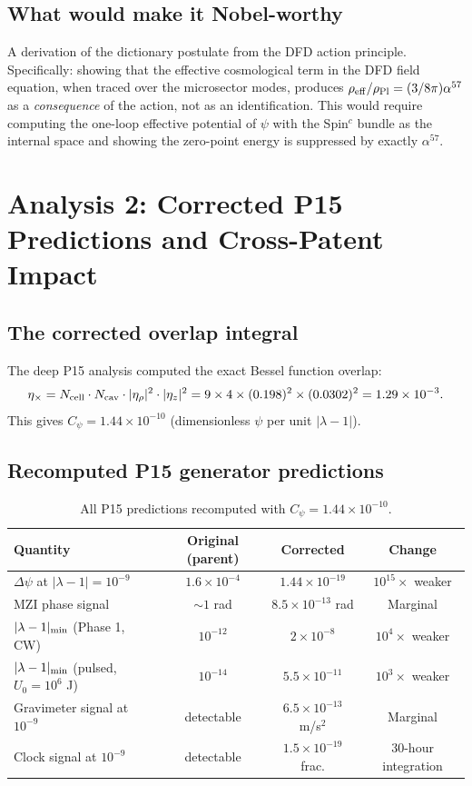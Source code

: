 \documentclass[11pt]{article}
\newcommand{\ee}[1]{\times 10^{#1}}
\begin{document}
\subsection{What would make it Nobel-worthy}

A derivation of the dictionary postulate from the DFD action principle. Specifically: showing that the effective cosmological term in the DFD field equation, when traced over the microsector modes, produces $\rho_{\rm eff}/\rho_{\rm Pl} = (3/8\pi)\alpha^{57}$ as a \emph{consequence} of the action, not as an identification. This would require computing the one-loop effective potential of $\psi$ with the Spin$^c$ bundle as the internal space and showing the zero-point energy is suppressed by exactly $\alpha^{57}$.

\section{Analysis 2: Corrected P15 Predictions and Cross-Patent Impact}
\label{sec:p15-corrected}

\subsection{The corrected overlap integral}

The deep P15 analysis computed the exact Bessel function overlap:
\[
\eta_\times = N_{\rm cell} \cdot N_{\rm cav} \cdot |\eta_\rho|^2 \cdot |\eta_z|^2 = 9 \times 4 \times (0.198)^2 \times (0.0302)^2 = 1.29\ee{-3}.
\]
This gives $C_\psi = 1.44\ee{-10}$ (dimensionless $\psi$ per unit $|\lambda-1|$).

\subsection{Recomputed P15 generator predictions}

\begin{table}[h]
\centering
\caption{All P15 predictions recomputed with $C_\psi = 1.44\ee{-10}$.}
\begin{tabular}{lccc}
\toprule
Quantity & Original (parent) & Corrected & Change \\
\midrule
$\Delta\psi$ at $|\lambda-1|=10^{-9}$ & $1.6\ee{-4}$ & $1.44\ee{-19}$ & $10^{15}\times$ weaker \\
MZI phase signal & $\sim 1$ rad & $8.5\ee{-13}$ rad & Marginal \\
$|\lambda-1|_{\rm min}$ (Phase 1, CW) & $10^{-12}$ & $2\ee{-8}$ & $10^4\times$ weaker \\
$|\lambda-1|_{\rm min}$ (pulsed, $U_0=10^6$ J) & $10^{-14}$ & $5.5\ee{-11}$ & $10^3\times$ weaker \\
Gravimeter signal at $10^{-9}$ & detectable & $6.5\ee{-13}$ m/s$^2$ & Marginal \\
Clock signal at $10^{-9}$ & detectable & $1.5\ee{-19}$ frac. & 30-hour integration \\
\bottomrule
\end{tabular}
\end{table}
\end{document}
